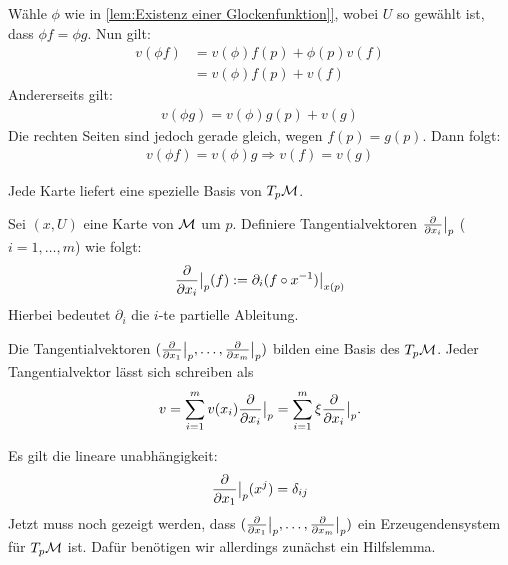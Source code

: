 
\begin{bew}[Beweis zweite Aussage Satz~\ref{satz:EigenschaftenTangentialraum]}]
Wähle $\phi$ wie in \ref{lem:Existenz einer Glockenfunktion]}, wobei $U$ so gewählt ist, dass $\phi f = \phi g$. 
Nun gilt:
\begin{align}
v(\phi f) &= v(\phi) f(p) + \phi(p) v(f) \\
&= v(\phi) f(p) + v(f)
\end{align}
Andererseits gilt:
\begin{align}
v(\phi g) = v(\phi)g(p) + v(g)
\end{align}
Die rechten Seiten sind jedoch gerade gleich, wegen $f(p) = g(p)$. 
Dann folgt:
\begin{align}
v(\phi f) = v(\phi)g
\Rightarrow v(f) = v(g)
\end{align}
\end{bew}

Jede Karte liefert eine spezielle Basis von $T_{p} \mathcal{M}$.

\begin{defs}
Sei $(x, U)$ eine Karte von $\mathcal{M}$ um $p$. 
Definiere Tangentialvektoren $\pdv{x_i}\big\vert_{p} $ ($i = 1, \dots, m$) wie folgt:
\begin{align}
\pdv{x_i}\big\vert_{p} (f) := \partial_i (f \circ x^{-1}) \big\vert_{x(p)}
\end{align}
Hierbei bedeutet $\partial_i$ die $i$-te partielle Ableitung.
\end{defs}

\begin{satz}
\label{satz:BasisTPM}
Die Tangentialvektoren $(\pdv{x_1}\big\vert_{p}, \dots, \pdv{x_m}\big\vert_{p})$ bilden eine Basis des $T_{p} \mathcal{M}$.
Jeder Tangentialvektor lässt sich schreiben als
\begin{align}
v = \sum_{i=1}^{m} v(x_i) \pdv{x_i}\big\vert_{p} = \sum_{i=1}^{m} \xi \pdv{x_i}\big\vert_{p}.
\end{align}
\end{satz}
\begin{bew}
Es gilt die lineare unabhängigkeit:
\begin{align}
\pdv{x_1}\big\vert_{p} (x^j) = \delta_{i j}
\end{align}
Jetzt muss noch gezeigt werden, dass $(\pdv{x_1}\big\vert_{p}, \dots, \pdv{x_m}\big\vert_{p})$ ein Erzeugendensystem für $T_{p} \mathcal{M}$ ist.
 Dafür benötigen wir allerdings zunächst ein Hilfslemma.
\end{bew}

